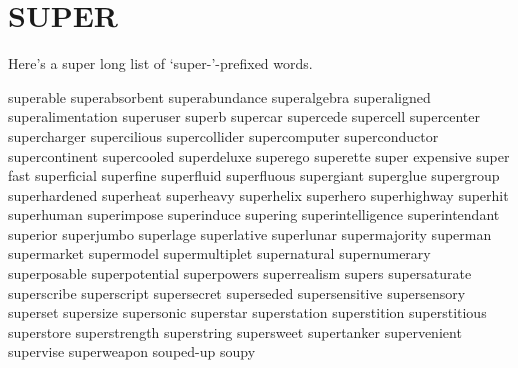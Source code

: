 \section{SUPER}
Here's a super long list of `super-'-prefixed words.

superable
superabsorbent
superabundance
superalgebra
superaligned
superalimentation
superuser
superb
supercar
supercede
supercell
supercenter
supercharger
supercilious
supercollider
supercomputer
superconductor
supercontinent
supercooled
superdeluxe
superego
superette
super expensive
super fast
superficial
superfine
superfluid
superfluous
supergiant
superglue
supergroup
superhardened
superheat
superheavy
superhelix
superhero
superhighway
superhit
superhuman
superimpose
superinduce
supering
superintelligence
superintendant
superior
superjumbo
superlage
superlative
superlunar
supermajority
superman
supermarket
supermodel
supermultiplet
supernatural
supernumerary
superposable
superpotential
superpowers
superrealism
supers
supersaturate
superscribe
superscript
supersecret
superseded
supersensitive
supersensory
superset
supersize
supersonic
superstar
superstation
superstition
superstitious
superstore
superstrength
superstring
supersweet
supertanker
supervenient
supervise
superweapon
souped-up
soupy
